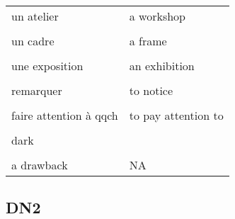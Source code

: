 \documentclass[
  10pt,
]{article}
\begin{document}
\begin{longtable}{ll}
un atelier & a workshop\\

\cellcolor{gray!6}{un conservateur de musée} & \cellcolor{gray!6}{a curator}\\

un cadre & a frame\\

\cellcolor{gray!6}{un indice} & \cellcolor{gray!6}{a clue}\\

une exposition & an exhibition\\

\cellcolor{gray!6}{exposer} & \cellcolor{gray!6}{to display}\\

remarquer & to notice\\

\cellcolor{gray!6}{perdu} & \cellcolor{gray!6}{unaccounted for}\\

faire attention à qqch & to pay attention to\\

\cellcolor{gray!6}{rendre visite à} & \cellcolor{gray!6}{to pay a visit to}\\

dark & \\

\cellcolor{gray!6}{bright} & \cellcolor{gray!6}{}\\

a drawback & \multirow[t]{-3}{*}{\raggedright\arraybackslash NA}\\
\bottomrule
\end{longtable}

\hypertarget{dn2}{%
\subsection{DN2}\label{dn2}}
\end{document}
